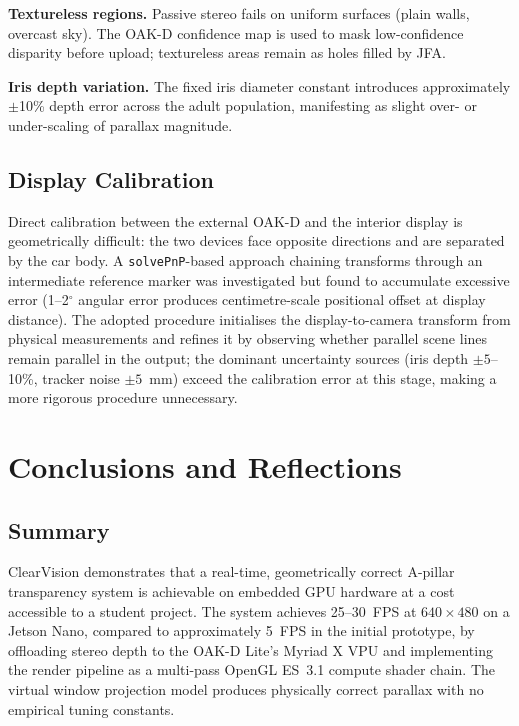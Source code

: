 \documentclass[11pt, a4paper]{report}
\begin{document}
\textbf{Textureless regions.}
Passive stereo fails on uniform surfaces (plain walls, overcast sky).
The OAK-D confidence map is used to mask low-confidence disparity before
upload; textureless areas remain as holes filled by JFA.

\textbf{Iris depth variation.}
The fixed iris diameter constant introduces approximately $\pm$10\% depth
error across the adult population, manifesting as slight over- or
under-scaling of parallax magnitude.

\section{Display Calibration}

Direct calibration between the external OAK-D and the interior display is
geometrically difficult: the two devices face opposite directions and are
separated by the car body.
A \texttt{solvePnP}-based approach chaining transforms through an
intermediate reference marker was investigated but found to accumulate
excessive error (1--2$^\circ$ angular error produces centimetre-scale
positional offset at display distance).
The adopted procedure initialises the display-to-camera transform from
physical measurements and refines it by observing whether parallel scene
lines remain parallel in the output; the dominant uncertainty sources
(iris depth $\pm5$--10\%, tracker noise $\pm5$~mm) exceed the calibration
error at this stage, making a more rigorous procedure unnecessary.

\chapter{Conclusions and Reflections}

\section{Summary}

ClearVision demonstrates that a real-time, geometrically correct
A-pillar transparency system is achievable on embedded GPU hardware at
a cost accessible to a student project.
The system achieves 25--30~FPS at $640\times480$ on a Jetson Nano,
compared to approximately 5~FPS in the initial prototype, by offloading
stereo depth to the OAK-D Lite's Myriad X VPU and implementing the
render pipeline as a multi-pass OpenGL ES~3.1 compute shader chain.
The virtual window projection model produces physically correct parallax
with no empirical tuning constants.
\end{document}
